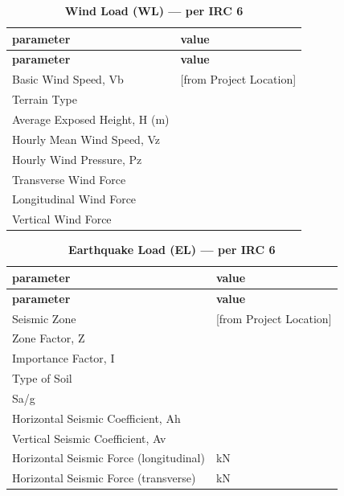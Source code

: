 \documentclass[12pt,a4paper]{report}
\numberwithin{table}{chapter}
\numberwithin{figure}{chapter}
\newcommand{\reportrowpad}{4pt}
\newcommand{\reportsectiongap}{0.75em}
\begin{document}
\vspace{\reportsectiongap}
\begin{longtable}{|L{5.5cm}|p{10.0cm}|}
\caption{\textbf{Wind Load (WL) --- per IRC 6}}\\
\hline
\textbf{parameter} & \textbf{value} \\
\hline
\endfirsthead
\hline
\textbf{parameter} & \textbf{value} \\
\hline
\endhead
\textnormal{Basic Wind Speed, Vb} &  [from Project Location] \\[\reportrowpad]
\hline
\textnormal{Terrain Type} &  \\[\reportrowpad]
\hline
\textnormal{Average Exposed Height, H (m)} &  \\[\reportrowpad]
\hline
\textnormal{Hourly Mean Wind Speed, Vz} &  \\[\reportrowpad]
\hline
\textnormal{Hourly Wind Pressure, Pz} &  \\[\reportrowpad]
\hline
\textnormal{Transverse Wind Force} &  \\[\reportrowpad]
\hline
\textnormal{Longitudinal Wind Force} &  \\[\reportrowpad]
\hline
\textnormal{Vertical Wind Force} &  \\[\reportrowpad]
\hline
\end{longtable}

\vspace{\reportsectiongap}
\begin{longtable}{|L{5.5cm}|p{10.0cm}|}
\caption{\textbf{Earthquake Load (EL) --- per IRC 6}}\\
\hline
\textbf{parameter} & \textbf{value} \\
\hline
\endfirsthead
\hline
\textbf{parameter} & \textbf{value} \\
\hline
\endhead
\textnormal{Seismic Zone} &  [from Project Location] \\[\reportrowpad]
\hline
\textnormal{Zone Factor, Z} &  \\[\reportrowpad]
\hline
\textnormal{Importance Factor, I} &  \\[\reportrowpad]
\hline
\textnormal{Type of Soil} &  \\[\reportrowpad]
\hline
\textnormal{Sa/g} &  \\[\reportrowpad]
\hline
\textnormal{Horizontal Seismic Coefficient, Ah} &  \\[\reportrowpad]
\hline
\textnormal{Vertical Seismic Coefficient, Av} &  \\[\reportrowpad]
\hline
\textnormal{Horizontal Seismic Force (longitudinal)} &  kN \\[\reportrowpad]
\hline
\textnormal{Horizontal Seismic Force (transverse)} &  kN \\[\reportrowpad]
\hline
\end{longtable}
\end{document}
